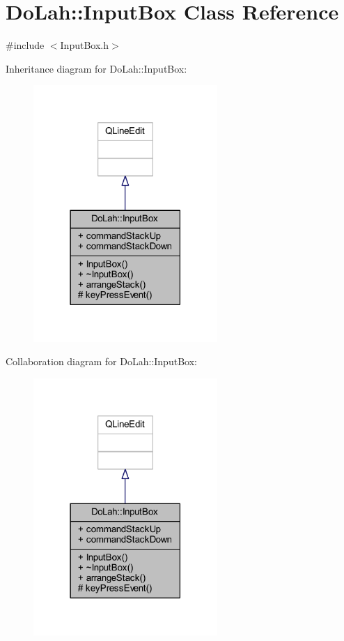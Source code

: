 \hypertarget{class_do_lah_1_1_input_box}{}\section{Do\+Lah\+:\+:Input\+Box Class Reference}
\label{class_do_lah_1_1_input_box}


{\ttfamily \#include $<$Input\+Box.\+h$>$}



Inheritance diagram for Do\+Lah\+:\+:Input\+Box\+:
\nopagebreak
\begin{figure}[H]
\begin{center}
\leavevmode
\includegraphics[width=198pt]{class_do_lah_1_1_input_box__inherit__graph}
\end{center}
\end{figure}


Collaboration diagram for Do\+Lah\+:\+:Input\+Box\+:
\nopagebreak
\begin{figure}[H]
\begin{center}
\leavevmode
\includegraphics[width=198pt]{class_do_lah_1_1_input_box__coll__graph}
\end{center}
\end{figure}
